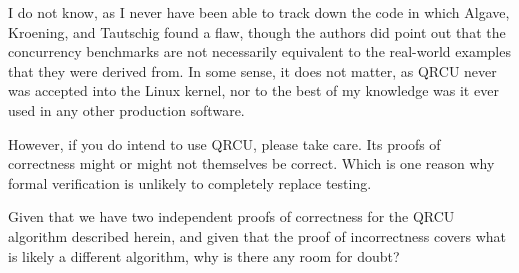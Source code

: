 I do not know, as I never have been able to track down the code in which
Algave, Kroening, and Tautschig found a flaw, though the authors did
point out that the concurrency benchmarks are not necessarily equivalent
to the real-world examples that they were derived from.
In some sense, it does not matter, as QRCU never was accepted into the
Linux kernel, nor to the best of my knowledge was it ever used in any
other production software.

However, if you do intend to use QRCU, please take care.
Its proofs of correctness might or might not themselves be correct.
Which is one reason why formal verification is unlikely to
completely replace testing.

\QuickQuiz{}
	Given that we have two independent proofs of correctness for
	the QRCU algorithm described herein, and given that the
	proof of incorrectness covers what is likely a different
	algorithm, why is there any room for doubt?
 \QuickQuizEnd

